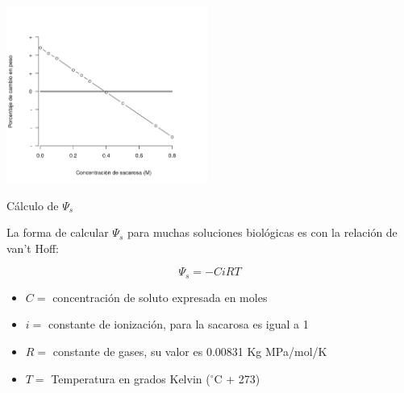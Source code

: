 \documentclass[12pt, aspectratio=169]{beamer}
\begin{document}
	\begin{frame}
			\includegraphics[width=250px]{graf_cambio.png}
		\centering
	\end{frame}

	\begin{frame}{C\'alculo  de $\Psi_s$}
		
		La forma de calcular $\Psi_s$ para muchas soluciones biol\'ogicas es con la relaci\'on de van't Hoff:
		
		$$ \Psi_s = -C i R T$$
		
		\begin{itemize}
			\item $C = $ concentraci\'on de soluto expresada en moles
			\item $i = $ constante de ionizaci\'on, para la sacarosa es igual a 1
			\item $R = $ constante de gases, su valor es 0.00831 Kg MPa/mol/K
			\item $T = $ Temperatura en grados Kelvin ($^\circ$C + 273) 
		\end{itemize}
		
	\end{frame}
\end{document}
